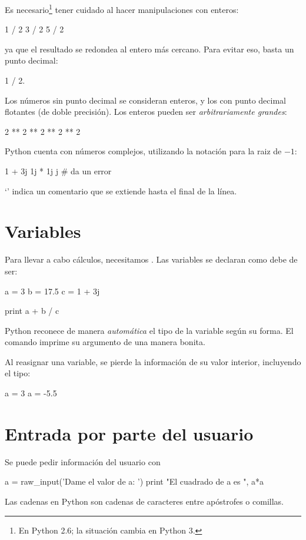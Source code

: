 Es necesario\footnote{En Python 2.6; la situación cambia en Python 3.} tener cuidado al hacer manipulaciones con enteros:
\begin{python}
1 / 2
3 / 2
5 / 2
\end{python}
ya que el resultado se redondea al entero más cercano. Para evitar eso, basta un punto decimal:
\begin{python}
1 / 2.
\end{python}


Los números sin punto decimal se consideran enteros, y los con punto decimal flotantes (de doble precisión).
Los enteros pueden ser \emph{arbitrariamente grandes}:
\begin{python}
2 ** 2 ** 2 ** 2 ** 2
\end{python}



Python cuenta con números complejos, utilizando la notación  para la raiz de $-1$:
\begin{python}
1 + 3j
1j * 1j
j    # da un error
\end{python}
`\inl{#}' indica un comentario que se extiende hasta el final de la línea.



\section{Variables}
Para llevar a cabo cálculos, necesitamos . Las variables se declaran como debe de ser:
\begin{python}
a = 3
b = 17.5
c = 1 + 3j

print a + b / c
\end{python}
Python reconece de manera \emph{automática} el tipo de la variable según su forma.
El comando  imprime su argumento de una manera bonita.

Al reasignar una variable, se pierde la información de su valor interior, incluyendo el tipo:
\begin{python}
a = 3
a = -5.5
\end{python}


\section{Entrada por parte del usuario}
Se puede pedir información del usuario con
\begin{python}
a = raw_input('Dame el valor de a: ')
print "El cuadrado de a es ", a*a
\end{python}
Las cadenas en Python son cadenas de caracteres entre apóstrofes o comillas. 


